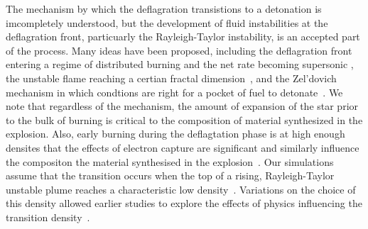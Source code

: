\documentclass[iop,apj]{emulateapj}
\begin{document}

The mechanism by which the deflagration transistions to a detonation
is imcompletely understood, but the development of fluid instabilities
at the deflagration front, particuarly the Rayleigh-Taylor 
instability, is an accepted part of the process.
Many ideas have been proposed, including the deflagration front
entering a regime of distributed burning and the net
rate becoming supersonic \citep{NiemWoos97}, the unstable
flame reaching a certian fractal dimension~\citep{woosley90},
and the Zel'dovich mechanism in which condtions are right for
a pocket of fuel to 
detonate~\citep{zeldovichetal1970,KhokOranWhee97,jacketal2014}.
We note that regardless of
the mechanism, the amount of expansion of the star prior to the bulk of burning
is critical to the composition of material synthesized in the explosion. Also,
early burning during the deflagtation phase is at high enough densites that
the effects of electron capture are significant and similarly influence the 
compositon the material synthesised in the explosion~\citep{hoeflichetal2004,
hoeflich2006,fesenetal2007,diamondetal2018}.
Our simulations assume that the transition occurs when the top of a 
rising, Rayleigh-Taylor unstable plume reaches a characteristic low
density~\citep{townsley.calder.ea:flame}. 
Variations on the choice of this density allowed earlier studies to explore
the effects of physics influencing the transition 
density~\citep{jacketal2010,Krueger2010On-Variations-o,kruegetal12}. 
\end{document}
